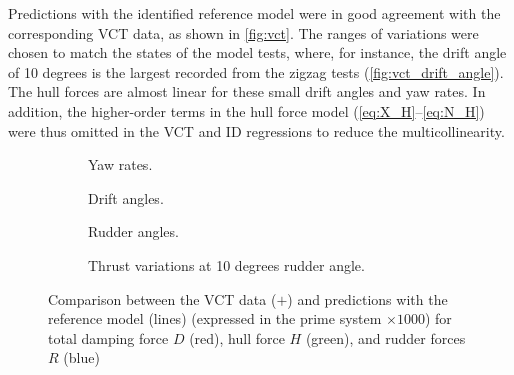 Predictions with the identified reference model were in good agreement with the corresponding VCT data, as shown in \autoref{fig:vct}. The ranges of variations were chosen to match the states of the model tests, where, for instance, the drift angle of 10 degrees is the largest recorded from the zigzag tests (\autoref{fig:vct_drift_angle}). The hull forces are almost linear for these small drift angles and yaw rates. In addition, the higher-order terms in the hull force model (\autoref{eq:X_H}--\autoref{eq:N_H}) were thus omitted in the VCT and ID regressions to reduce the multicollinearity.
\begin{figure}
    \centering
    \begin{subfigure}[b]{0.49\textwidth}
        \centering
        
        \caption{Yaw rates.}
        \label{fig:vct_circle}
    \end{subfigure}
    \hfill
    \begin{subfigure}[b]{0.49\textwidth}
        \centering
        
        \caption{Drift angles.}
        \label{fig:vct_drift_angle}
    \end{subfigure}
    \begin{subfigure}[b]{0.49\textwidth}
        \centering
        
        \caption{Rudder angles.}
        \label{fig:vct_rudder_angle}
    \end{subfigure}
    \hfill
    \begin{subfigure}[b]{0.49\textwidth}
        \centering
        
        \caption{Thrust variations at 10 degrees rudder angle.}
        \label{fig:vct_thrust_variation}
    \end{subfigure}
    \caption{Comparison between the VCT data ($+$) and predictions with the reference model (lines) (expressed in the prime system $\times 1000$) for total damping force $D$ (red), hull force $H$ (green), and rudder forces $R$ (blue)}
    \label{fig:vct}
\end{figure}